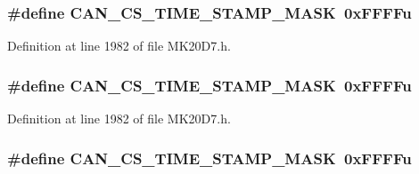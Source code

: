 \subsubsection[{\texorpdfstring{C\+A\+N\+\_\+\+C\+S\+\_\+\+T\+I\+M\+E\+\_\+\+S\+T\+A\+M\+P\+\_\+\+M\+A\+SK}{CAN_CS_TIME_STAMP_MASK}}]{\setlength{\rightskip}{0pt plus 5cm}\#define C\+A\+N\+\_\+\+C\+S\+\_\+\+T\+I\+M\+E\+\_\+\+S\+T\+A\+M\+P\+\_\+\+M\+A\+SK~0x\+F\+F\+F\+Fu}\hypertarget{group___c_a_n___register___masks_ga70e77ee06fb6bf69b46020d1e3b91819}{}\label{group___c_a_n___register___masks_ga70e77ee06fb6bf69b46020d1e3b91819}


Definition at line 1982 of file M\+K20\+D7.\+h.

\subsubsection[{\texorpdfstring{C\+A\+N\+\_\+\+C\+S\+\_\+\+T\+I\+M\+E\+\_\+\+S\+T\+A\+M\+P\+\_\+\+M\+A\+SK}{CAN_CS_TIME_STAMP_MASK}}]{\setlength{\rightskip}{0pt plus 5cm}\#define C\+A\+N\+\_\+\+C\+S\+\_\+\+T\+I\+M\+E\+\_\+\+S\+T\+A\+M\+P\+\_\+\+M\+A\+SK~0x\+F\+F\+F\+Fu}\hypertarget{group___c_a_n___register___masks_ga70e77ee06fb6bf69b46020d1e3b91819}{}\label{group___c_a_n___register___masks_ga70e77ee06fb6bf69b46020d1e3b91819}


Definition at line 1982 of file M\+K20\+D7.\+h.

\subsubsection[{\texorpdfstring{C\+A\+N\+\_\+\+C\+S\+\_\+\+T\+I\+M\+E\+\_\+\+S\+T\+A\+M\+P\+\_\+\+M\+A\+SK}{CAN_CS_TIME_STAMP_MASK}}]{\setlength{\rightskip}{0pt plus 5cm}\#define C\+A\+N\+\_\+\+C\+S\+\_\+\+T\+I\+M\+E\+\_\+\+S\+T\+A\+M\+P\+\_\+\+M\+A\+SK~0x\+F\+F\+F\+Fu}\hypertarget{group___c_a_n___register___masks_ga70e77ee06fb6bf69b46020d1e3b91819}{}\label{group___c_a_n___register___masks_ga70e77ee06fb6bf69b46020d1e3b91819}


